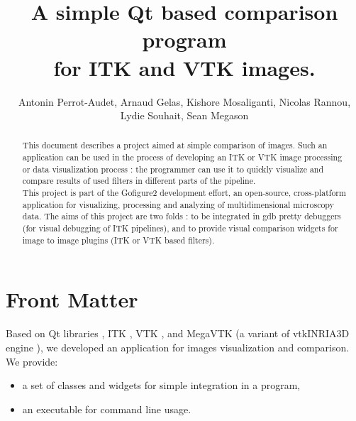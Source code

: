 \documentclass{InsightArticle}
\title{A simple Qt based comparison program\\ for ITK and VTK images.}
\author{Antonin Perrot-Audet, Arnaud Gelas, Kishore Mosaliganti, Nicolas Rannou, Lydie Souhait, Sean Megason}
\newcommand{\IJhandlerIDnumber}{1338}
\begin{document}
\IJhandlefooter{\IJhandlerIDnumber}


\ifpdf
\else
\fi

\maketitle

\ifhtml
\chapter*{Front Matter\label{front}}
\fi

\begin{abstract}
\noindent
This document describes a project aimed at simple comparison of images.
Such an application can be used in the process of developing an ITK or VTK image processing or data visualization process : the programmer can use it to quickly visualize and compare results of used filters in different parts of the pipeline.\\
This project is part of the Gofigure2 \cite{refGofigure2} development effort, an open-source, cross-platform application for visualizing, processing and analyzing of multidimensional microscopy data. The aims of this project are two folds : to be integrated in gdb pretty debuggers \cite{McCornic-VisualDebug}  (for visual debugging of ITK pipelines), and to provide visual comparison widgets for image to image plugins (ITK or VTK based filters).
\end{abstract}

\IJhandlenote{\IJhandlerIDnumber}

\tableofcontents

Based on Qt libraries \cite{refQT}, ITK \cite{ITKSoftwareGuide}, VTK \cite{vtkExamples}, and MegaVTK (a variant of vtkINRIA3D engine \cite{vtkINRIA}), we developed an application for images visualization and comparison.
We provide:
\begin{itemize}
 \item a set of classes and widgets for simple integration in a program, 
 \item an executable for command line usage.
\end{itemize} 
\end{document}
